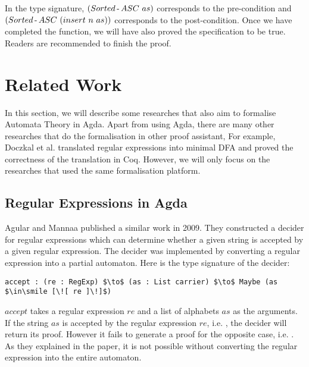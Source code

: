 \par In the type signature, \((Sorted\hyphen ASC\ as)\) corresponds to the pre-condition and
\((Sorted\operatorname{-} ASC\ (insert\ n\ as))\) corresponds to the
post-condition. Once we have completed the
function, we will have also proved the specification to be
true. Readers are recommended to finish the proof. 



\newpage
\section{Related Work}
\par In this section, we will describe some researches that also aim
to formalise Automata Theory in Agda. Apart from using Agda, there are
many other researches that do the formalisation in other proof
assistant, For example, Doczkal et al. \cite{doczkal2013}
translated regular expressions into minimal DFA and proved the
correctness of the translation in Coq. However, we will only 
focus on the researches that used the same formalisation platform. 


\subsection{Regular Expressions in Agda}
\par Agular and Mannaa published a
similar work \cite{agular2009} in 2009. They constructed a decider for
regular expressions which can determine whether
a given string is accepted by a given regular expression. The decider
was implemented by converting a regular expression into a
partial automaton. Here is the type signature of the decider: 
\begin{lstlisting}[mathescape=true,xleftmargin=.3\textwidth]
accept : (re : RegExp) $\to$ (as : List carrier) $\to$ Maybe (as $\in\smile [\![ re ]\!]$)
\end{lstlisting}
\par \(accept\) takes a regular expression \(re\) and a list of
alphabets \(as\) as the arguments. If the string \(as\) is accepted
by the regular expression \(re\), i.e. , the decider will return its proof. However it fails to generate a
proof for the opposite case, i.e. . As they
explained in the paper, it is not possible without converting the regular expression into
the entire automaton. 


